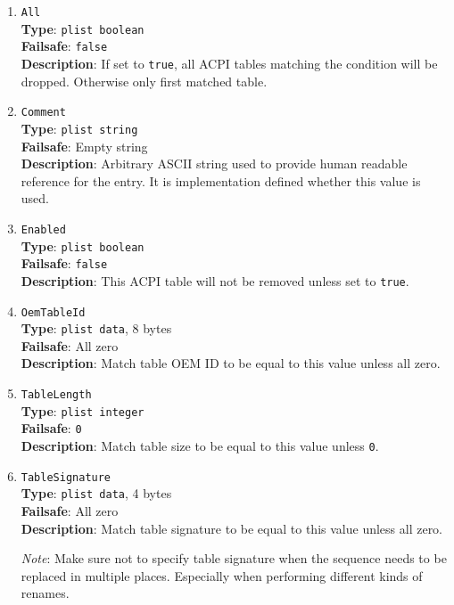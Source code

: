 \documentclass[]{article}
\begin{document}
\begin{enumerate}
\item
  \texttt{All}\\
  \textbf{Type}: \texttt{plist\ boolean}\\
  \textbf{Failsafe}: \texttt{false}\\
  \textbf{Description}: If set to \texttt{true}, all ACPI tables matching the
  condition will be dropped. Otherwise only first matched table.

\item
  \texttt{Comment}\\
  \textbf{Type}: \texttt{plist\ string}\\
  \textbf{Failsafe}: Empty string\\
  \textbf{Description}: Arbitrary ASCII string used to provide human readable
  reference for the entry. It is implementation defined whether this value is
  used.

\item
  \texttt{Enabled}\\
  \textbf{Type}: \texttt{plist\ boolean}\\
  \textbf{Failsafe}: \texttt{false}\\
  \textbf{Description}: This ACPI table will not be removed unless set to
  \texttt{true}.

\item
  \texttt{OemTableId}\\
  \textbf{Type}: \texttt{plist\ data}, 8 bytes\\
  \textbf{Failsafe}: All zero\\
  \textbf{Description}: Match table OEM ID to be equal to this value
  unless all zero.

\item
  \texttt{TableLength}\\
  \textbf{Type}: \texttt{plist\ integer}\\
  \textbf{Failsafe}: \texttt{0}\\
  \textbf{Description}: Match table size to be equal to this value
  unless \texttt{0}.

\item
  \texttt{TableSignature}\\
  \textbf{Type}: \texttt{plist\ data}, 4 bytes\\
  \textbf{Failsafe}: All zero\\
  \textbf{Description}: Match table signature to be equal to this value
  unless all zero.

  \emph{Note}: Make sure not to specify table signature when the sequence
  needs to be replaced in multiple places. Especially when performing
  different kinds of renames.

\end{enumerate}
\end{document}
